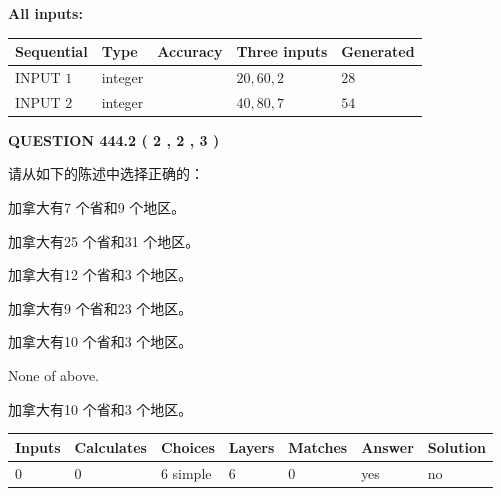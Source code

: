 \documentclass{ctexart}
\begin{document}
   
   
   
\noindent\vspace{0.1in}\hspace{-0.08in} {\textbf{\Large{All inputs: }}}
   
   
  
  
\noindent\begin{tabular}{|l|l|l|l|l|}
\hline
 Sequential & Type & Accuracy & Three inputs & Generated \\ 
\hline
 
 
  INPUT $  1 $ & integer &  & $
 20
 , 
 60
 , 
 2
 $ & $ 28 $ 
 \\  \hline  
 
 
  INPUT $  2 $ & integer &  & $
 40
 , 
 80
 , 
 7
 $ & $ 54 $ 
 \\  \hline  
 \end{tabular}
   
   
  
\vspace{0.2in}
  
{\textbf{\Large{QUESTION
444.2 
 ( 2 , 2 , 3 )
}}}
  
  
请从如下的陈述中选择正确的：
 
 
加拿大有7 个省和9 个地区。
 
 
加拿大有25 个省和31 个地区。
 
 
加拿大有12 个省和3 个地区。
 
 
加拿大有9 个省和23 个地区。
 
 
加拿大有10 个省和3 个地区。
 
 
 None of above.
 
 
\noindent{}
 
 
加拿大有10 个省和3 个地区。
 
 
\noindent{}
 
 
   
   
   
   
\noindent\begin{tabular}{|l|l|l|l|l|l|l|}
 \hline
Inputs & Calculates & Choices & Layers & Matches & Answer & Solution \\ \hline
 0  & 
 0  & 
 6
  simple  
  & 
 6  & 
 0  & 
  yes & 
  no 
  \\ \hline
 \end{tabular}
   
\end{document}
